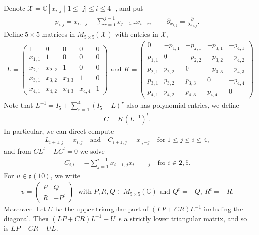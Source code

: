 \documentclass[12pt]{article}
\numberwithin{equation}{section}
\theoremstyle{definition}
\theoremstyle{remark}
\begin{document}
Denote $\mathscr{X}=\mathbb{C}[x_{i,j}\mid 1\leqslant|j|\leqslant i\leqslant 4]$, and put
\begin{eqnarray}
	p_{i,j}=x_{i,-j}+\sum\limits_{r=1}^{j-1}x_{j-1,r}x_{i,-r},\qquad \partial_{x_{i,j}}=\frac{\partial}{\partial x_{i,j}}.
\end{eqnarray} 
Define $5\times 5$ matrices in $M_{5\times 5}(\mathscr{X})$ with entries in $\mathscr{X}$,
\begin{eqnarray}
	L=\begin{pmatrix}
		1&0&0&0&0\\
		x_{1,1}&1&0&0&0\\
		x_{2,1}&x_{2,2}&1&0&0\\
		x_{3,1}&x_{3,2}&x_{3,3}&1&0\\
		x_{4,1}&x_{4,2}&x_{4,3}&x_{4,4}&1
	\end{pmatrix}
\text{~and~}
	K=\begin{pmatrix}
		0&-p_{1,1}&-p_{2,1}&-p_{3,1}&-p_{4,1}\\
		p_{1,1}&0&-p_{2,2}&-p_{3,2}&-p_{4,2}\\
		p_{2,1}&p_{2,2}&0&-p_{3,3}&-p_{4,3}\\
		p_{3,1}&p_{3,2}&p_{3,3}&0&-p_{4,4}\\
		p_{4,1}&p_{4,2}&p_{4,3}&p_{4,4}&0
	\end{pmatrix}. \label{2.8}
\end{eqnarray}
Note that $L^{-1}=I_5+\sum_{r=1}^4(I_5-L)^r$ also has polynomial entries, we define
\begin{eqnarray}
	C=K(L^{-1})^t. \label{2.9}
\end{eqnarray}
In particular, we can direct compute
\begin{align}
	L_{i+1,j}=x_{i,j}\quad\text{and}\quad C_{i+1,j}=x_{i,-j}\quad\text{for }1\leqslant j\leqslant i\leqslant 4,\label{lc}
\end{align}
and from $CL^t+LC^t=0$ we solve
\begin{eqnarray}
	C_{i,i}=-\sum_{j=1}^{i-1}x_{i-1,j}x_{i-1,-j}\quad\text{for }i\in\overline{2,5}. \label{cc}
\end{eqnarray}
For $u\in\mathfrak{o}(10)$, we write
\begin{align}
	u=\begin{pmatrix}
		P&Q\\R&-P^{t}
	\end{pmatrix}\;\text{ with }P,R,Q\in M_{5\times 5}(\mathbb{C})\text{ and }Q^{t}=-Q,~R^{t}=-R.
\end{align}
Moreover. Let $U$ be the upper triangular part of $(LP+CR)L^{-1}$ including the diagonal. Then $(LP+CR)L^{-1}-U$ is a strictly lower triangular matrix, and so is $LP+CR-UL$.
\end{document}
